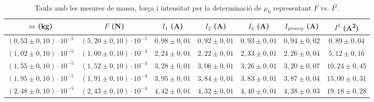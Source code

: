 \documentclass[a4paper,10.5pt]{report}
\begin{document}
\begin{appendices}
\begin{table}[h]
	\centering
	\small %
	\renewcommand{\arraystretch}{1.2}
	\caption{Taula amb les mesures de massa, força i intensitat per la determinació de $\mu_0$ representant $F$ vs. $I^2$.}
	\begin{tabular}{ccccccc}
		\toprule
		$m$ (kg) & $F$ (N) & $I_1$ (A) & $I_2$ (A) & $I_3$ (A) & $I_{promig}$ (A) & $I^2$ (A\textsuperscript{2}) \\
		\midrule
		\((0,53 \pm 0,10) \cdot 10^{-5}\) & \((5,20 \pm 0,10) \cdot 10^{-5}\) & \(0,98 \pm 0,01\) & \(0,92 \pm 0,01\) & \(0,93 \pm 0,01\) & \(0,94 \pm 0,02\) & \(0,89 \pm 0,04\) \\
		\((1,02 \pm 0,10) \cdot 10^{-5}\) & \((1,00 \pm 0,10) \cdot 10^{-4}\) & \(2,24 \pm 0,01\) & \(2,22 \pm 0,01\) & \(2,33 \pm 0,01\) & \(2,26 \pm 0,04\) & \(5,12 \pm 0,16\) \\
		\((1,55 \pm 0,10) \cdot 10^{-5}\) & \((1,52 \pm 0,10) \cdot 10^{-4}\) & \(3,28 \pm 0,01\) & \(3,06 \pm 0,01\) & \(3,26 \pm 0,01\) & \(3,20 \pm 0,07\) & \(10,24 \pm 0,45\) \\
		\((1,95 \pm 0,10) \cdot 10^{-5}\) & \((1,91 \pm 0,10) \cdot 10^{-4}\) & \(3,95 \pm 0,01\) & \(3,84 \pm 0,01\) & \(3,83 \pm 0,01\) & \(3,87 \pm 0,04\) & \(15,00 \pm 0,31\) \\
		\((2,48 \pm 0,10) \cdot 10^{-5}\) & \((2,43 \pm 0,10) \cdot 10^{-4}\) & \(4,42 \pm 0,01\) & \(4,32 \pm 0,01\) & \(4,40 \pm 0,01\) & \(4,38 \pm 0,03\) & \(19,18 \pm 0,28\) \\
		\bottomrule
	\end{tabular}
	\label{tab:taula_mesures}
\end{table}



\end{appendices}
\end{document}
